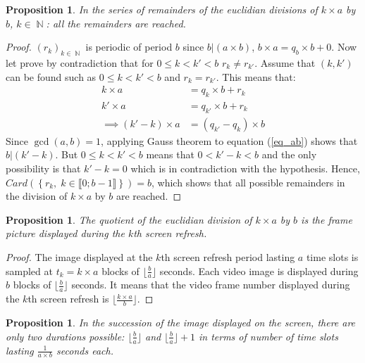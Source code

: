\documentclass[11pt,a4paper]{article}
\DeclareMathOperator{\NN}{\mathbb{N}}
\theoremstyle{plain}
\newtheorem{prop}[thm]{Proposition}
\theoremstyle{definition}
\theoremstyle{remark}
\begin{document}
\begin{prop}
In the series of remainders of the euclidian divisions of $k\times a$ by $b$, $k\in \NN$: all the remainders are reached.
\end{prop}\label{prop_rem}
\begin{proof}
$(r_k)_{k\in\NN}$ is periodic of period $b$ since $b|(a\times b)$, $b\times a=q_b\times b +0$. Now let prove by contradiction that for $0\leq k<k'<b$ $r_k\neq r_{k'}$.
Assume that $(k, k')$ can be found such as $0\leq k<k'<b$ and $r_k=r_{k'}$. This means that:
\begin{align}
k\times a  &= q_k\times b+r_k\nonumber\\
k'\times a  &= q_{k'}\times b+r_k\nonumber\\
\implies (k'-k)\times a&=(q_{k'}-q_k)\times b\label{eq_ab}
\end{align}
Since $\gcd(a,b)=1$, applying Gauss theorem to equation (\ref{eq_ab}) shows that $b|(k'-k)$. But $0\leq k<k'<b$ means that $0<k'-k<b$ and the only possibility is that $k'-k=0$ which is in contradiction with the hypothesis.
Hence, $Card\left(\left\{r_k,\;k\in \llbracket 0;b-1\rrbracket\right\}\right)=b$, which shows that all possible remainders in the division of $k\times a$ by $b$ are reached. 
\end{proof}

\begin{prop}
The quotient of the euclidian division of $k\times a$ by $b$ is the frame picture displayed during the $k$th screen refresh.
\end{prop}\label{prop_disp}
\begin{proof}
The image displayed at the $k$th screen refresh period lasting $a$ time slots is sampled at $t_k=k\times a$ blocks of $\lfloor\frac{b}{a}\rfloor$ seconds.
Each video image is displayed during $b$ blocks of $\lfloor\frac{b}{a}\rfloor$ seconds. It means that the video frame number displayed during the $k$th screen refresh is $\lfloor\frac{k\times a}{b}\rfloor$.
\end{proof}

\begin{prop}
In the succession of the image displayed on the screen, there are only two durations possible: $\lfloor\frac{b}{a}\rfloor$ and $\lfloor\frac{b}{a}\rfloor+1$ in terms of number of time slots lasting $\frac{1}{a\times b}$ seconds each.
\end{prop}\label{prop_block}
\end{document}
